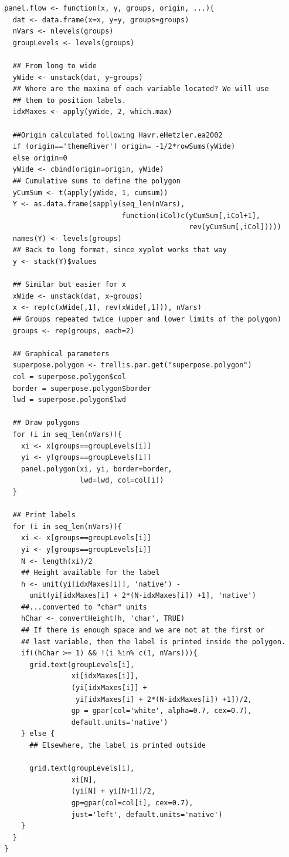 \documentclass[smallroyalvopaper]{memoir}
\begin{document}
\lstset{language=r,label= ,caption= ,captionpos=b,numbers=none}
\begin{lstlisting}
  panel.flow <- function(x, y, groups, origin, ...){
    dat <- data.frame(x=x, y=y, groups=groups)
    nVars <- nlevels(groups)
    groupLevels <- levels(groups)
  
    ## From long to wide
    yWide <- unstack(dat, y~groups)
    ## Where are the maxima of each variable located? We will use
    ## them to position labels.
    idxMaxes <- apply(yWide, 2, which.max)
  
    ##Origin calculated following Havr.eHetzler.ea2002
    if (origin=='themeRiver') origin= -1/2*rowSums(yWide)
    else origin=0 
    yWide <- cbind(origin=origin, yWide)
    ## Cumulative sums to define the polygon
    yCumSum <- t(apply(yWide, 1, cumsum))
    Y <- as.data.frame(sapply(seq_len(nVars),
                              function(iCol)c(yCumSum[,iCol+1],
                                              rev(yCumSum[,iCol]))))
    names(Y) <- levels(groups)
    ## Back to long format, since xyplot works that way
    y <- stack(Y)$values
  
    ## Similar but easier for x
    xWide <- unstack(dat, x~groups)
    x <- rep(c(xWide[,1], rev(xWide[,1])), nVars)
    ## Groups repeated twice (upper and lower limits of the polygon)
    groups <- rep(groups, each=2)
    
    ## Graphical parameters
    superpose.polygon <- trellis.par.get("superpose.polygon")
    col = superpose.polygon$col
    border = superpose.polygon$border 
    lwd = superpose.polygon$lwd 
  
    ## Draw polygons
    for (i in seq_len(nVars)){
      xi <- x[groups==groupLevels[i]]
      yi <- y[groups==groupLevels[i]]
      panel.polygon(xi, yi, border=border,
                    lwd=lwd, col=col[i])
    }
  
    ## Print labels
    for (i in seq_len(nVars)){
      xi <- x[groups==groupLevels[i]]
      yi <- y[groups==groupLevels[i]]
      N <- length(xi)/2
      ## Height available for the label
      h <- unit(yi[idxMaxes[i]], 'native') -
        unit(yi[idxMaxes[i] + 2*(N-idxMaxes[i]) +1], 'native')
      ##...converted to "char" units
      hChar <- convertHeight(h, 'char', TRUE)
      ## If there is enough space and we are not at the first or
      ## last variable, then the label is printed inside the polygon.
      if((hChar >= 1) && !(i %in% c(1, nVars))){
        grid.text(groupLevels[i],
                  xi[idxMaxes[i]],
                  (yi[idxMaxes[i]] +
                   yi[idxMaxes[i] + 2*(N-idxMaxes[i]) +1])/2,
                  gp = gpar(col='white', alpha=0.7, cex=0.7),
                  default.units='native')
      } else {
        ## Elsewhere, the label is printed outside
  
        grid.text(groupLevels[i],
                  xi[N],
                  (yi[N] + yi[N+1])/2,
                  gp=gpar(col=col[i], cex=0.7),
                  just='left', default.units='native')
      }          
    }
  }
\end{lstlisting}
\end{document}
